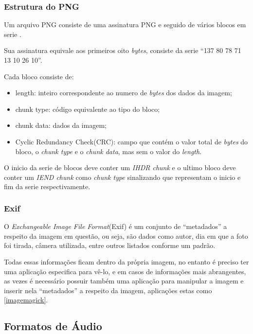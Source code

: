 \subsubsection{Estrutura do PNG}

Um arquivo PNG consiste de uma assinatura PNG e seguido de vários blocos em serie \cite{PNG-BOOK}.

Sua assinatura equivale aos primeiros oito \textit{bytes}, consiste da serie “137 80 78 71 13 10 26 10”.

Cada bloco consiste de:

\begin{itemize}
    \item{length: inteiro correspondente ao numero de \textit{bytes} dos dados da imagem;}
    \item{chunk type: código equivalente ao tipo do bloco;}
    \item{chunk data: dados da imagem;}
    \item{Cyclic Redundancy Check(CRC): campo que contém o valor total de \textit{bytes} do bloco, o \textit{chunk type} e o \textit{chunk data}, mas sem o valor do \textit{length}.}
\end{itemize}

O inicio da serie de blocos deve conter um \textit{IHDR chunk} e o ultimo bloco deve conter um \textit{IEND chunk} como \textit{chunk type} sinalizando que representam o inicio e fim da serie respectivamente.

\subsubsection{Exif}

O \textit{Exchangeable Image File Format}(Exif) é um conjunto de ``metadados'' a respeito da imagem em questão, ou seja, são dados como autor, dia em que a foto foi tirada, câmera utilizada, entre outros listados conforme um padrão.

Todas essas informações ficam dentro da própria imagem, no entanto é preciso ter uma aplicação especifica para vê-lo, e em casos de informações mais abrangentes, as vezes é necessário possuir também uma aplicação para manipular a imagem e inserir nela ``metadados'' a respeito da imagem, aplicações estas como \ref{imagemagick}.

\subsection{Formatos de Áudio}

